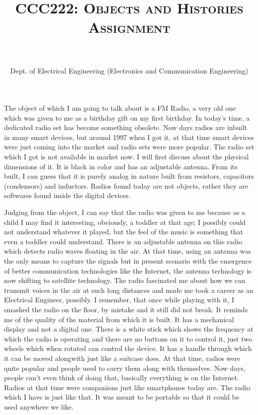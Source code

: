\documentclass{article}
\title{\textsc{CCC222: Objects and Histories Assignment}}
\author{\fontfamily{qag}\selectfont {\textbf{Author}: Himanshu Sharma \hspace{50mm} \textbf{ Roll Number}: 1610110149} \\\\ \fontfamily{qag}\selectfont Dept. of Electrical Engineering (Electronics and Communication Engineering)}}
\date{}
\begin{document}
\maketitle
{\selectfont
The object of which I am going to talk about is a FM Radio, a very old one which was given to me as a birthday gift on my first birthday. In today's time, a dedicated radio set has become something obsolete. Now days radios are inbuilt in many smart devices, but around 1997 when I got it, at that time smart devices were just coming into the market and radio sets were more popular. The radio set which I got is not available in market now. I will first discuss about the physical dimensions of it. It is black in color and has an adjustable antenna. From its built, I can guess that it is purely analog in nature built from resistors, capacitors (condensors) and inductors. Radios found today are not objects, rather they are softwares found inside the digital devices. 

\par Judging from the object, I can say that the radio was given to me because as a child I may find it interesting, obviously, a toddler at that age; I possibly could not understand whatever it played, but the feel of the music is something that even a toddler could understand. There is an adjustable antenna on this radio which detects radio waves floating in the air. At that time, using an antenna was the only means to capture the signals but in present scenario with the emergence of better communication technologies like the Internet, the antenna technology is now shifting to satellite technology. The radio fascinated me about how we can transmit voices in the air at such long distances and made me took a career as an Electrical Engineer, possibly. I remember, that once while playing with it, I smashed the radio on the floor, by mistake and it still did not break. It reminds me of the quality of the material from which it is built. It has a mechanical display and not a digital one. There is a white stick which shows the frequency at which the radio is operating and there are no buttons on it to control it, just two wheels which when rotated can control the device. It has a handle through which it can be moved alongwith just like a suitcase does. At that time, radios were quite popular and people used to carry them along with themselves. Now days, people can't even think of doing that, basically everything is on the Internet. Radios at that time were companions just like smartphones today are. The radio which I have is just like that. It was meant to be portable so that it could be used anywhere we like. 

}
\end{document}
